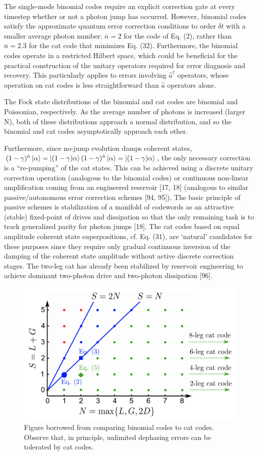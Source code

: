 \documentclass[12]{amsart}
\newcommand\0{\mathbf{0}}
\newcommand\<{\langle}
\renewcommand\>{\rangle}
\begin{document}
The single-mode binomial codes require an explicit correction gate at every timestep whether or not a photon jump has occurred. However, binomial codes satisfy the approximate quantum error correction conditions to order $\delta t$ with a smaller average photon number: $\bar{n} = 2$ for the code of Eq. (2), rather than $\bar{n} = 2.3$ for the cat code that minimizes Eq. (32). Furthermore, the binomial codes operate in a restricted Hilbert space, which could be beneficial for the practical construction of the unitary operators required for error diagnosis and recovery. This particularly applies to errors involving $\hat{a}^\dag$ operators, whose operation on cat codes is less straightforward than $\hat{a}$ operators alone.

The Fock state distributions of the binomial and cat codes are binomial and Poissonian, respectively. As the average number of photons is increased (larger N), both of these distributions approach a normal distribution, and so the binomial and cat codes asymptotically approach each other. 

Furthermore, since no-jump evolution damps coherent states, $(1 - \gamma)^{\hat{n}}\ket{\alpha} = \ket{(1 - \gamma) \alpha}(1 - \gamma)^{\hat{n}}\ket{\alpha} = \ket{(1 - \gamma) \alpha}$, the only necessary correction is a “re-pumping” of the cat states. This can be achieved using a discrete unitary correction operation (analogous to the binomial codes) or continuous non-linear amplification coming from an engineered reservoir [17, 18] (analogous to similar passive/autonomous error correction schemes [94, 95]). The basic principle of passive schemes is stabilization of a manifold of codewords as an attractive (stable) fixed-point of drives and dissipation so that the only remaining task is to track generalized parity for photon jumps [18]. The cat codes based on equal amplitude coherent state superpositions, cf. Eq. (31), are ‘natural’ candidates for these purposes since they require only gradual continuous inversion of the damping of the coherent state amplitude without active discrete correction stages. The two-leg cat has already been stabilized by reservoir engineering to achieve dominant two-photon drive and two-photon dissipation [96].

\begin{figure}
\centering
\includegraphics[width=0.5\linewidth,keepaspectratio]{binom_cat.png}	
\caption{Figure borrowed from \cite{michael2016new} comparing binomial codes to cat codes. Observe that, in principle, unlimited dephasing errors can be tolerated by cat codes.}
\end{figure}
\end{document}
